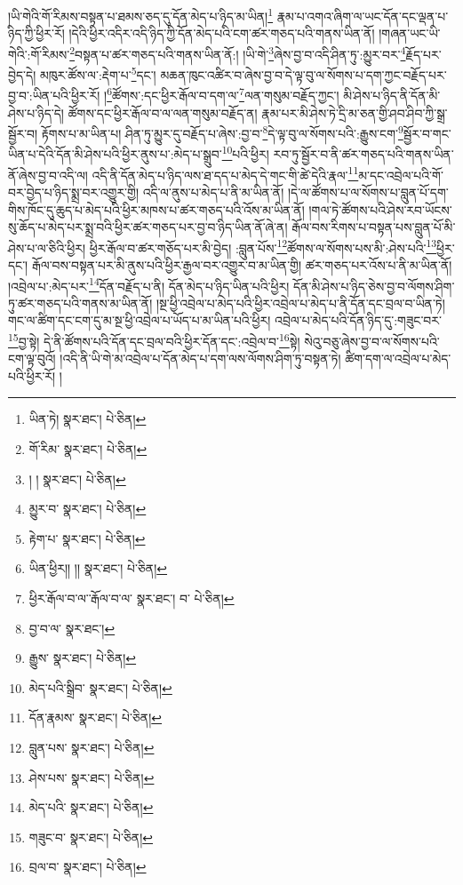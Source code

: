 །ཡི་གེའི་གོ་རིམས་བསྟན་པ་ཐམས་ཅད་དུ་དོན་མེད་པ་ཉིད་མ་ཡིན།\footnote{ཡིན་ཏེ།  སྣར་ཐང་།  པེ་ཅིན། } རྣམ་པ་འགའ་ཞིག་ལ་ཡང་དོན་དང་ལྡན་པ་ཉིད་ཀྱི་ཕྱིར་རོ། །དེའི་ཕྱིར་འདིར་འདི་ཉིད་ཀྱི་དོན་མེད་པའི་ངག་ཚར་གཅད་པའི་གནས་ཡིན་ནོ། །གཞན་ཡང་ཡི་གེའི་:གོ་རིམས་\footnote{གོ་རིམ་  སྣར་ཐང་།  པེ་ཅིན། }བསྟན་པ་ཚར་གཅད་པའི་གནས་ཡིན་ནོ:། །ཡི་གེ་\footnote{། །  སྣར་ཐང་།  པེ་ཅིན། }ཞེས་བྱ་བ་འདི་ཤིན་ཏུ་:མྱུར་བར་\footnote{མྱུར་བ་  སྣར་ཐང་།  པེ་ཅིན། }རྗོད་པར་བྱེད་དེ། མཁུར་ཚོས་ལ་:རྡེག་པ་\footnote{རྟེག་པ་  སྣར་ཐང་།  པེ་ཅིན། }དང་། མཆན་ཁུང་འཚིར་བ་ཞེས་བྱ་བ་དེ་ལྟ་བུ་ལ་སོགས་པ་དག་ཀྱང་བརྗོད་པར་བྱ་བ་:ཡིན་པའི་ཕྱིར་རོ། །\footnote{ཡིན་ཕྱིར།། །།  སྣར་ཐང་།  པེ་ཅིན། }ཚོགས་:དང་ཕྱིར་རྒོལ་བ་དག་ལ་\footnote{ཕྱིར་རྒོལ་བ་ལ་་རྒོལ་བ་ལ་  སྣར་ཐང་། བ་  པེ་ཅིན། }ལན་གསུམ་བརྗོད་ཀྱང་། མི་ཤེས་པ་ཉིད་ནི་དོན་མི་ཤེས་པ་ཉིད་དེ། ཚོགས་དང་ཕྱིར་རྒོལ་བ་ལ་ལན་གསུམ་བརྗོད་ན། རྣམ་པར་མི་ཤེས་ཏེ་དྲི་མ་ཅན་གྱི་ཤབ་ཤིབ་ཀྱི་སྒྲ་སྦྱོར་བ། རྟོགས་པ་མ་ཡིན་པ། ཤིན་ཏུ་མྱུར་དུ་བརྗོད་པ་ཞེས་:བྱ་བ་\footnote{བྱ་བ་ལ་  སྣར་ཐང་། }དེ་ལྟ་བུ་ལ་སོགས་པའི་:རྒྱུས་ངག་\footnote{རྒྱུས་  སྣར་ཐང་།  པེ་ཅིན། }སྦྱོར་བ་གང་ཡིན་པ་དེའི་དོན་མི་ཤེས་པའི་ཕྱིར་ནུས་པ་:མེད་པ་སྒྲུབ་\footnote{མེད་པའི་སྒྲིབ་  སྣར་ཐང་།  པེ་ཅིན། }པའི་ཕྱིར། རབ་ཏུ་སྦྱོར་བ་ནི་ཚར་གཅད་པའི་གནས་ཡིན་ནོ་ཞེས་བྱ་བ་འདི་ལ། འདི་ནི་དོན་མེད་པ་ཉིད་ལས་ཐ་དད་པ་མེད་དེ་གང་གི་ཚེ་དེའི་རྣལ་\footnote{དོན་རྣམས་  སྣར་ཐང་།  པེ་ཅིན། }མ་དང་འབྲེལ་པའི་གོ་བར་བྱེད་པ་ཉིད་སྨྲ་བར་འགྱུར་གྱི། འདི་ལ་ནུས་པ་མེད་པ་ནི་མ་ཡིན་ནོ། །དེ་ལ་ཚོགས་པ་ལ་སོགས་པ་བླུན་པོ་དག་གིས་ཁོང་དུ་ཆུད་པ་མེད་པའི་ཕྱིར་མཁས་པ་ཚར་གཅད་པའི་འོས་མ་ཡིན་ནོ། །གལ་ཏེ་ཚོགས་པའི་ཤེས་རབ་ཡོངས་སུ་ཆོད་པ་མེད་པར་སྨྲ་བའི་ཕྱིར་ཚར་གཅད་པར་བྱ་བ་ཉིད་ཡིན་ནོ་ཞེ་ན། རྒོལ་བས་རིགས་པ་བསྟན་པས་བླུན་པོ་མི་ཤེས་པ་ལ་ཅིའི་ཕྱིར། ཕྱིར་རྒོལ་བ་ཚར་གཅོད་པར་མི་བྱེད། :བླུན་པོས་\footnote{བླུན་པས་  སྣར་ཐང་།  པེ་ཅིན། }ཚོགས་ལ་སོགས་པས་མི་:ཤེས་པའི་\footnote{ཤེས་པས་  སྣར་ཐང་།  པེ་ཅིན། }ཕྱིར་དང་། རྒོལ་བས་བསྟན་པར་མི་ནུས་པའི་ཕྱིར་རྒྱལ་བར་འགྱུར་བ་མ་ཡིན་གྱི། ཚར་གཅད་པར་འོས་པ་ནི་མ་ཡིན་ནོ། །འབྲེལ་པ་:མེད་པར་\footnote{མེད་པའི་  སྣར་ཐང་།  པེ་ཅིན། }དོན་བརྗོད་པ་ནི། དོན་མེད་པ་ཉིད་ཡིན་པའི་ཕྱིར། དོན་མི་ཤེས་པ་ཉིད་ཅེས་བྱ་བ་ལོགས་ཤིག་ཏུ་ཚར་གཅད་པའི་གནས་མ་ཡིན་ནོ། །སྔ་ཕྱི་འབྲེལ་པ་མེད་པའི་ཕྱིར་འབྲེལ་པ་མེད་པ་ནི་དོན་དང་བྲལ་བ་ཡིན་ཏེ། གང་ལ་ཚིག་དང་ངག་དུ་མ་སྔ་ཕྱི་འབྲེལ་པ་ཡོད་པ་མ་ཡིན་པའི་ཕྱིར། འབྲེལ་པ་མེད་པའི་དོན་ཉིད་དུ་:གཟུང་བར་\footnote{གཟུང་བ་  སྣར་ཐང་།  པེ་ཅིན། }བྱ་སྟེ། དེ་ནི་ཚོགས་པའི་དོན་དང་བྲལ་བའི་ཕྱིར་དོན་དང་:འབྲེལ་བ་\footnote{བྲལ་བ་  སྣར་ཐང་།  པེ་ཅིན། }སྟེ། སེའུ་བཅུ་ཞེས་བྱ་བ་ལ་སོགས་པའི་ངག་ལྟ་བུའོ། །འདི་ནི་ཡི་གེ་མ་འབྲེལ་པ་དོན་མེད་པ་དག་ལས་ལོགས་ཤིག་ཏུ་བསྟན་ཏེ། ཚིག་དག་ལ་འབྲེལ་པ་མེད་པའི་ཕྱིར་རོ། །
